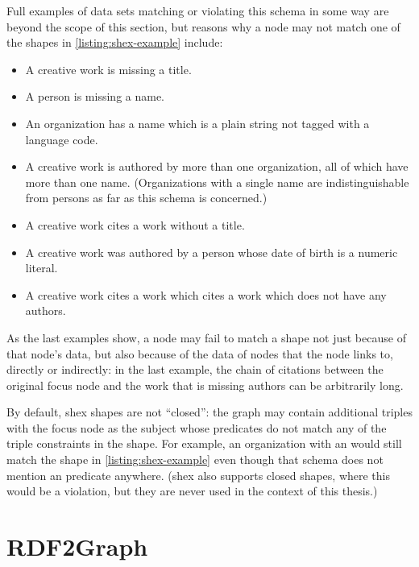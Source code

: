 Full examples of data sets matching or violating this \gls{schema} in some way
are beyond the scope of this section,
but reasons why a node may not match one of the \glspl{shape} in \cref{listing:shex-example} include:

\begin{itemize}
\item A creative work is missing a title.
\item A person is missing a name.
\item An organization has a name which is a plain string not tagged with a language code.
\item A creative work is authored by more than one organization,
  all of which have more than one name.
  (Organizations with a single name are indistinguishable from persons
  as far as this schema is concerned.)
\item A creative work cites a work without a title.
\item A creative work was authored by a person whose date of birth is a numeric literal.
\item A creative work cites a work which cites a work which does not have any authors.
\end{itemize}

As the last examples show,
a node may fail to match a \gls{shape} not just because of that node’s data,
but also because of the data of nodes that the node links to,
directly or indirectly:
in the last example,
the chain of citations between the original \gls{focus node} and the work that is missing authors
can be arbitrarily long.

By default, \gls{shex} \glspl{shape} are not “closed”:
the graph may contain additional \glspl{triple} with the \gls{focus node} as the \gls{subject}
whose \glspl{predicate} do not match any of the \glspl{triple constraint} in the \gls{shape}.
For example, an organization with an  would still match the  shape in \cref{listing:shex-example}
even though that \gls{schema} does not mention an  \gls{predicate} anywhere.
(\Gls{shex} also supports closed \glspl{shape},
where this would be a violation,
but they are never used in the context of this thesis.)

\section{\gls{RDF2Graph}}
\label{sec:Background:RDF2Graph}

